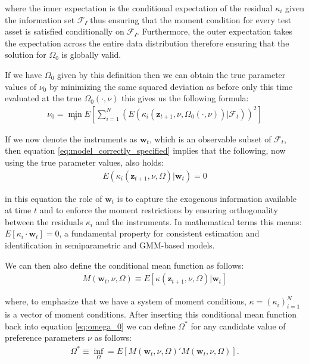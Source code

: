 \documentclass[12pt,a4paper]{article}
\begin{document}
		where the inner expectation is the conditional expectation of the residual $\kappa_i$ given the information set $\mathcal{F_t}$ thus ensuring that the moment condition for every test asset is satisfied conditionally on $\mathcal{F_t}$. Furthermore, the outer expectation takes the expectation across the entire data distribution therefore ensuring that the solution for $\Omega_0$ is globally valid. 
		
		If we have $\Omega_0$ given by this definition then we can obtain the true parameter values of $\nu_0$ by minimizing the same squared deviation as before only this time evaluated at the true $\Omega_0(\cdot, \nu)$ this gives us the following formula: 
		\begin{align}
			\nu_0 = \underset{\nu}{\min} E \left[ \sum_{i = 1}^{N} (E( \kappa_i(\textbf{z}_{t+1}, \nu, \Omega_0(\cdot, \nu)) | \mathcal{F}_t))^2 \right]
			\label{eq:nu_0}
		\end{align}
		
		If we now denote the instruments as $\textbf{w}_t$, which is an observable subset of $\mathcal{F}_t$, then equation \ref{eq:model_correctly_specified} implies that the following, now using the true parameter values, also holds:
		\begin{align}
				E(\kappa_i(\textbf{z}_{t+1}, \nu, \Omega) | \textbf{w}_t) = 0
				\label{eq:correct_model}
		\end{align}
		
		in this equation the role of $\textbf{w}_t$ is to capture the exogenous information available at time $t$ and to enforce the moment restrictions by ensuring orthogonality between the residuals $\kappa_i$ and the instruments. In mathematical terms this means: $E[\kappa_i \cdot \textbf{w}_t] = 0$, a fundamental property for consistent estimation and identification in semiparametric and GMM-based models.
		
		We can then also define the conditional mean function as follows:
		\begin{align}
			M (\textbf{w}_t, \nu, \Omega) \equiv E[\kappa (\textbf{z}_{t+1}, \nu, \Omega) | \textbf{w}_t]
			\label{eq:cond_mean_condition}
		\end{align}
		
		where, to emphasize that we have a system of moment conditions, $\kappa = (\kappa_i)_{i=1}^{N}$ is a vector of moment conditions. 
		After inserting this conditional mean function back into equation \ref{eq:omega_0} we can define $\Omega^*$ for any candidate value of preference parameters $\nu$ as follows:
		\begin{align}
			\Omega^* \equiv \underset{\Omega}{\inf} = E [ M(\textbf{w}_t, \nu, \Omega)'  M(\textbf{w}_t, \nu, \Omega)].
			\label{eq:omega_star}
		\end{align}
		
\end{document}
